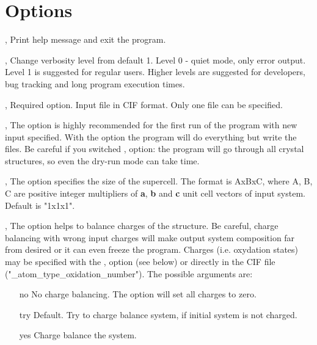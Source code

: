 \documentclass[a4paper,english]{article}
\begin{document}
\section{Options}
\begin{Description}

\item[\oOpt{-h}, \oOpt{\Dd help}]
      Print help message and exit the program.

\item[\oOptArg{-v }{level}, \oOptArg{\Dd verbose=}{level}] 
      Change verbosity level from default 1. Level 0 - quiet mode, only error output. Level 1 is suggested for regular users. Higher levels are suggested for developers, bug tracking and long program execution times. 

\item[\OptArg{-i }{input-file}, \OptArg{\Dd input=}{input-file}]
      Required option. Input file in CIF format. Only one file can be specified.

\item[\oOpt{-d}, \oOpt{\Dd dry-run}]
      The option is highly recommended for the first run of the program with new input specified. 
      With the option the program will do everything but write the files. Be careful if you switched ,  option: the program will go through all crystal structures, so even the dry-run mode can take time.

\item[\oOptArg{-s }{cell-size}, \oOptArg{\Dd cell-size=}{cell-size}]
      The option specifies the size of the supercell. The format is AxBxC, where A, B, C are positive integer multipliers of \textbf{a}, \textbf{b} and \textbf{c} unit cell vectors of input system. Default is "1x1x1".

\item[\oOptArg{-c }{balance-type}, \oOptArg{\Dd charge-balance=}{balance-type}]
      The option helps to balance charges of the structure. Be careful, charge balancing with wrong input charges will make output system composition far from desired or it can even freeze the program. Charges (i.e. oxydation states) may be specified with the ,  option (see below) or directly in the CIF file ("\_atom\_type\_oxidation\_number"). The possible arguments are:
      \begin{itemize}
         \item[no]   No charge balancing. The option will set all charges to zero.
         \item[try]  Default. Try to charge balance system, if initial system is not charged.
         \item[yes]  Charge balance the system.
      \end{itemize}


\end{Description}
\end{document}
